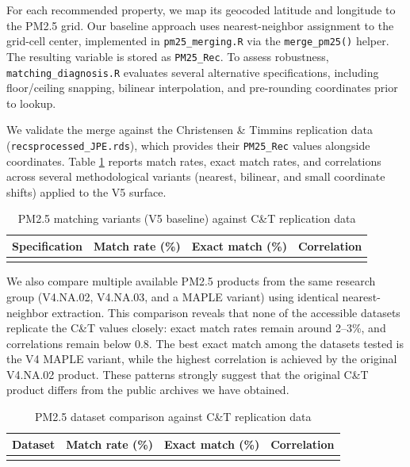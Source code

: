 \documentclass{article}
\begin{document}
For each recommended property, we map its geocoded latitude and longitude to the PM2.5 grid. Our baseline approach uses nearest-neighbor assignment to the grid-cell center, implemented in \texttt{pm25\_merging.R} via the \texttt{merge\_pm25()} helper. The resulting variable is stored as \texttt{PM25\_Rec}. To assess robustness, \texttt{matching\_diagnosis.R} evaluates several alternative specifications, including floor/ceiling snapping, bilinear interpolation, and pre-rounding coordinates prior to lookup.

We validate the merge against the Christensen \& Timmins replication data (\texttt{recsprocessed\_JPE.rds}), which provides their \texttt{PM25\_Rec} values alongside coordinates. Table \ref{tab:pm25-matching} reports match rates, exact match rates, and correlations across several methodological variants (nearest, bilinear, and small coordinate shifts) applied to the V5 surface.

\begin{table}[h]
\centering
\caption{PM2.5 matching variants (V5 baseline) against C\&T replication data}
\label{tab:pm25-matching}
\begin{tabular}{lrrr}
\toprule
Specification & Match rate (\%) & Exact match (\%) & Correlation \\
\midrule
\\
\bottomrule
\end{tabular}
\end{table}

We also compare multiple available PM2.5 products from the same research group (V4.NA.02, V4.NA.03, and a MAPLE variant) using identical nearest-neighbor extraction. This comparison reveals that none of the accessible datasets replicate the C\&T values closely: exact match rates remain around 2--3\%, and correlations remain below 0.8. The best exact match among the datasets tested is the V4 MAPLE variant, while the highest correlation is achieved by the original V4.NA.02 product. These patterns strongly suggest that the original C\&T product differs from the public archives we have obtained.

\begin{table}[h]
\centering
\caption{PM2.5 dataset comparison against C\&T replication data}
\label{tab:pm25-datasets}
\begin{tabular}{lrrr}
\toprule
Dataset & Match rate (\%) & Exact match (\%) & Correlation \\
\midrule
\\
\bottomrule
\end{tabular}
\end{table}
\end{document}
